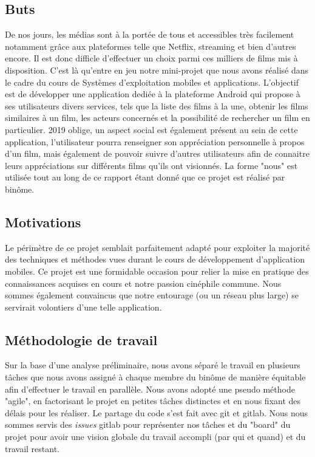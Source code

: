 
\subsection{Buts}
De nos jours, les médias sont à la portée de tous et accessibles très facilement notamment grâce aux plateformes telle que Netflix, streaming et bien d'autres encore. Il est donc difficle d'effectuer un choix parmi ces milliers de films mis à disposition. C'est là qu'entre en jeu notre mini-projet que nous avons réalisé dans le cadre du cours de Systèmes d'exploitation mobiles et applications. L'objectif est de développer une application dediée à la plateforme Android qui propose à ses utilisateurs divers services, tels que la liste des films à la une, obtenir les films similaires à un film, les acteurs concernés et la possibilité de rechercher un film en particulier.
2019 oblige, un aspect social est également présent au sein de cette application, l'utilisateur pourra renseigner son appréciation personnelle à propos d'un film, mais également de pouvoir suivre d'autres utilisateurs afin de connaitre leurs appréciations sur différents films qu'ils ont visionnés.
La forme "nous" est utilisée tout au long de ce rapport étant donné que ce projet est réalisé par binôme.

\subsection{Motivations}
Le périmètre de ce projet semblait parfaitement adapté pour exploiter la majorité des techniques et méthodes vues durant le cours de développement d'application mobiles.
Ce projet est une formidable occasion pour relier la mise en pratique des connaissances acquises en cours et notre passion cinéphile commune. Nous sommes également convaincus que notre entourage (ou un réseau plus large) se servirait volontiers d'une telle application.

\subsection{Méthodologie de travail}
Sur la base d'une analyse préliminaire, nous avons séparé le travail en plusieurs tâches que nous avons assigné à chaque membre du binôme de manière équitable afin d'effectuer le travail en parallèle.
Nous avons adopté une pseudo méthode "agile", en factorisant le projet en petites tâches distinctes et en nous fixant des délais pour les réaliser. Le partage du code s'est fait avec git et gitlab. Nous nous sommes servis des \textit{issues} gitlab pour représenter nos tâches et du "board" du projet pour avoir une vision globale du travail accompli (par qui et quand) et du travail restant.
